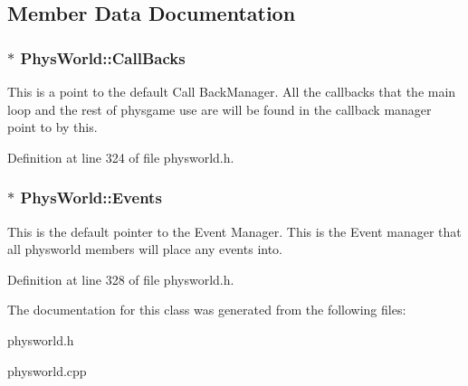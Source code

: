 \subsection{Member Data Documentation}
\hypertarget{classPhysWorld_a080ea6f1584374b07d3c1f29c7ed64df}{
\subsubsection[{CallBacks}]{$\ast$ {\bf PhysWorld::CallBacks}}}
\label{db/df5/classPhysWorld_a080ea6f1584374b07d3c1f29c7ed64df}


This is a point to the default Call BackManager. All the callbacks that the main loop and the rest of physgame use are will be found in the callback manager point to by this. 

Definition at line 324 of file physworld.h.\hypertarget{classPhysWorld_a601b3c6093aaf2a69fcd3311dde9aadc}{
\subsubsection[{Events}]{$\ast$ {\bf PhysWorld::Events}}}
\label{db/df5/classPhysWorld_a601b3c6093aaf2a69fcd3311dde9aadc}


This is the default pointer to the Event Manager. This is the Event manager that all physworld members will place any events into. 

Definition at line 328 of file physworld.h.

The documentation for this class was generated from the following files:\begin{DoxyCompactItemize}
\item 
physworld.h\item 
physworld.cpp\end{DoxyCompactItemize}
